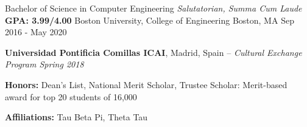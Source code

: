 



\begin{cventries}


\cventry
{Bachelor of Science in Computer Engineering {\bullet} \textit{Salutatorian, Summa Cum Laude} {\bullet} \textbf{GPA: 3.99/4.00}} %
{Boston University, College of Engineering} %
{Boston, MA} %
{Sep 2016 - May 2020} %
{ %
\begin{cvitems}
\item {\textbf{Universidad Pontificia Comillas ICAI}, Madrid, Spain -- \textit{Cultural Exchange Program Spring 2018}}
\item {\textbf{Honors:} Dean’s List, National Merit Scholar, Trustee Scholar: Merit-based award for top 20 students of 16,000}
\item {\textbf{Affiliations:} Tau Beta Pi, Theta Tau}
\end{cvitems}
}


\end{cventries}
